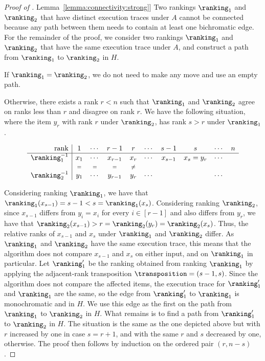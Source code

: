 \documentclass[11pt]{article}
\numberwithin{equation}{section}
\theoremstyle{definition}
\theoremstyle{plain}
\newcommand{\expref}[2]{\hyperref[#2]{#1~\ref{#2}}}
\begin{document}
\begin{proof}[Proof of \expref{Lemma}{lemma:connectivity:strong}]
Two rankings $\ranking_1$ and $\ranking_2$ that have distinct execution traces under $A$ cannot be connected because any path between them needs to contain at least one bichromatic edge. For the remainder of the proof, we consider two rankings $\ranking_1$ and $\ranking_2$ that have the same execution trace under $A$, and construct a path from $\ranking_1$ to $\ranking_2$ in $H$.

If $\ranking_1 = \ranking_2$, we do not need to make any move and use an empty path. 

Otherwise, there exists a rank $r<n$ such that $\ranking_1$ and $\ranking_2$ agree on ranks less than $r$ and disagree on rank $r$. We have the following situation, where the item $y_r$ with rank $r$ under $\ranking_2$, has rank $s>r$ under $\ranking_1$. 

\begin{equation*}
    \begin{array}{r|ccccccccc}
      \text{rank} & 1 & \cdots &  r-1 &   r & \cdots & s-1 & s & \cdots &   n \\
      \hline
      \ranking_1^{-1} & x_1 & \cdots & x_{r-1} &   x_r  & \cdots & x_{s-1} & x_s = y_r & \cdots &     \\
       & {\scriptstyle =}  & {\scriptstyle =}  & {\scriptstyle =}  &  {\scriptstyle \ne}  &    &    &  &   &    \\
      \ranking_2^{-1} & y_1 & \cdots & y_{r-1} & y_r & \cdots &     &     & \cdots &    
    \end{array}
\end{equation*}

Considering ranking $\ranking_1$, we have that $\ranking_1(x_{s-1}) = s-1 < s = \ranking_1(x_s)$. Considering ranking $\ranking_2$, since $x_{s-1}$ differs from $y_i=x_i$ for every $i \in [r-1]$ and also differs from $y_r$, we have that $\ranking_2(x_{s-1}) > r = \ranking_2(y_r) = \ranking_2(x_s)$. Thus, the relative ranks of $x_{s-1}$ and $x_s$ under $\ranking_1$ and $\ranking_2$ differ. As $\ranking_1$ and $\ranking_2$ have the same execution trace, this means that the algorithm does not compare $x_{s-1}$ and $x_s$ on either input, and on $\ranking_1$ in particular. Let $\ranking'_1$ be the ranking obtained from ranking $\ranking_1$ by applying the adjacent-rank transposition $\transposition = (s-1,s)$. Since the algorithm does not compare the affected items, the execution trace for $\ranking'_1$ and $\ranking_1$ are the same, so the edge from $\ranking'_1$ to $\ranking_1$ is monochromatic and in $H$. We use this edge as the first on the path from $\ranking_1$ to $\ranking_2$ in $H$. What remains is to find a path from $\ranking'_1$ to $\ranking_2$ in $H$. The situation is the same as the one depicted above but with $r$ increased by one in case $s=r+1$, and with the same $r$ and $s$ decreased by one, otherwise. The proof then follows by induction on the ordered pair $(r,n-s)$. 
\end{proof}
\end{document}
